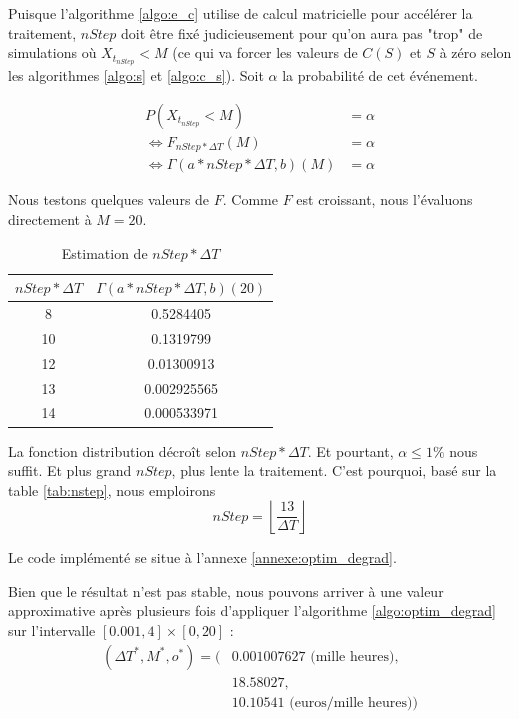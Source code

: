\documentclass[10pt,a4paper]{article}
\begin{document}
\FloatBarrier
Puisque l'algorithme \eqref{algo:e_c} utilise de calcul matricielle pour accélérer la traitement, $nStep$ doit être fixé judicieusement pour qu'on aura pas "trop" de simulations où $X_{t_{nStep}} < M$ (ce qui va forcer les valeurs de $C(S)$ et $S$ à zéro selon les algorithmes \eqref{algo:s} et \eqref{algo:c_s}). Soit $\alpha$ la probabilité de cet événement.

\begin{align*}
    P\left( {{X_{{t_{nStep}}}} < M} \right) & = \alpha  \\
    \Leftrightarrow {F_{nStep*\Delta T}}\left( M \right) & = \alpha \\
    \Leftrightarrow \Gamma \left( {a*nStep*\Delta T,b} \right)\left( M \right) & = \alpha 
\end{align*}

Nous testons quelques valeurs de $F$. Comme $F$ est croissant, nous l'évaluons directement à $M=20$.

\begin{table}[!h]
    \centering
    \begin{tabular}{|c|c|}
      \hline
      $nStep * \Delta T$ &  $\Gamma \left( {a*nStep*\Delta T,b} \right)\left( 20 \right)$\\
      \hline
      8 & 0.5284405 \\
      10 & 0.1319799 \\
      12 & 0.01300913 \\
      13 & 0.002925565 \\
      14 & 0.000533971 \\
      \hline
    \end{tabular}
    \caption{Estimation de $nStep * \Delta T$}
    \label{tab:nstep}
\end{table}

La fonction distribution décroît selon $nStep*\Delta T$. Et pourtant, $\alpha \leq 1\%$ nous suffit. Et plus grand $nStep$, plus lente la traitement. C'est pourquoi, basé sur la table \eqref{tab:nstep}, nous emploirons
\[nStep = \left\lfloor {\frac{{13}}{{\Delta T}}} \right\rfloor \]

Le code implémenté se situe à l'annexe \ref{annexe:optim_degrad}. 

Bien que le résultat n'est pas stable, nous pouvons arriver à une valeur approximative après plusieurs fois d'appliquer l'algorithme \ref{algo:optim_degrad} sur l'intervalle $[0.001, 4] \times [0, 20]$ : 
\begin{align*}
    (\Delta T^*, M^*, o^*) = (& 0.001007627 \text{ (mille heures)},\\
    & 18.58027,\\
    & 10.10541 \text{ (euros/mille heures)})
\end{align*}
\end{document}
